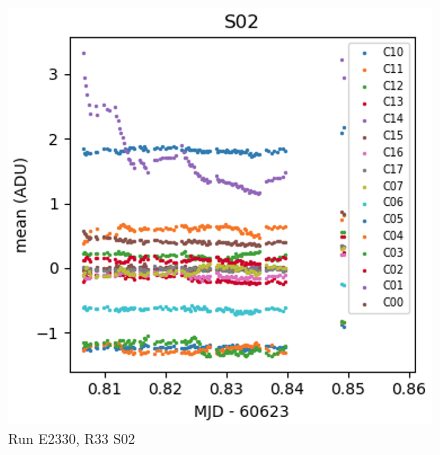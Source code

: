 \begin{figure}[htbp]
\vspace{0.05\textwidth}

\begin{minipage}[b]{0.45\textwidth}
    \centering
    \includegraphics[width=\textwidth]{sections/figures/E2330_R33_S02.png}
    \caption{Run E2330, R33 S02}
\end{minipage}
\hspace{0.05\textwidth}
\hfill
\begin{minipage}[b]{0.45\textwidth}
    \centering
\end{minipage}
\end{figure}


%
%

